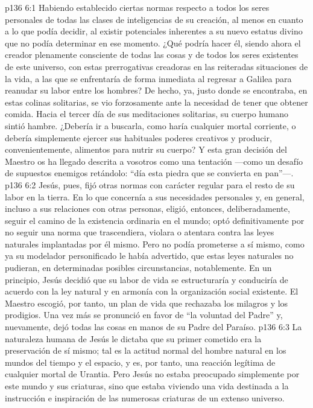 \vs p136 6:1 Habiendo establecido ciertas normas respecto a todos los seres personales de todas las clases de inteligencias de su creación, al menos en cuanto a lo que podía decidir, al existir potenciales inherentes a su nuevo estatus divino que no podía determinar en ese momento. ¿Qué podría hacer él, siendo ahora el creador plenamente consciente de todas las cosas y de todos los seres existentes de este universo, con estas prerrogativas creadoras en las reiteradas situaciones de la vida, a las que se enfrentaría de forma inmediata al regresar a Galilea para reanudar su labor entre los hombres? De hecho, ya, justo donde se encontraba, en estas colinas solitarias, se vio forzosamente ante la necesidad de tener que obtener comida. Hacia el tercer día de sus meditaciones solitarias, su cuerpo humano sintió hambre. ¿Debería ir a buscarla, como haría cualquier mortal corriente, o debería simplemente ejercer sus habituales poderes creativos y producir, convenientemente, alimentos para nutrir su cuerpo? Y esta gran decisión del Maestro os ha llegado descrita a vosotros como una tentación ---como un desafío de supuestos enemigos retándolo: “día esta piedra que se convierta en pan”---.
\vs p136 6:2 Jesús, pues, fijó otras normas con carácter regular para el resto de su labor en la tierra. En lo que concernía a sus necesidades personales y, en general, incluso a sus relaciones con otras personas, eligió, entonces, deliberadamente, seguir el camino de la existencia ordinaria en el mundo; optó definitivamente por no seguir una norma que trascendiera, violara o atentara contra las leyes naturales implantadas por él mismo. Pero no podía prometerse a sí mismo, como ya su modelador personificado le había advertido, que estas leyes naturales no pudieran, en determinadas posibles circunstancias,  notablemente. En un principio, Jesús decidió que su labor de vida se estructuraría y conduciría de acuerdo con la ley natural y en armonía con la organización social existente. El Maestro escogió, por tanto, un plan de vida que rechazaba los milagros y los prodigios. Una vez más se pronunció en favor de “la voluntad del Padre” y, nuevamente, dejó todas las cosas en manos de su Padre del Paraíso.
\vs p136 6:3 La naturaleza humana de Jesús le dictaba que su primer cometido era la preservación de sí mismo; tal es la actitud normal del hombre natural en los mundos del tiempo y el espacio, y es, por tanto, una reacción legítima de cualquier mortal de Urantia. Pero Jesús no estaba preocupado simplemente por este mundo y sus criaturas, sino que estaba viviendo una vida destinada a la instrucción e inspiración de las numerosas criaturas de un extenso universo.
